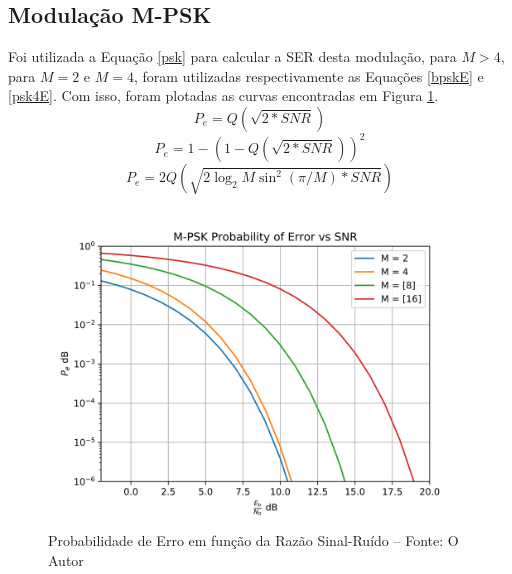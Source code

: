 \documentclass[10pt,two column,a4paper]{article}
\begin{document}
	\subsection{Modulação M-PSK}
	Foi utilizada a Equação \eqref{psk} para calcular a SER desta modulação, para $M>4$, para $M=2$ e $M=4$, foram utilizadas respectivamente as Equações \eqref{bpskE} e \eqref{psk4E}. Com isso, foram plotadas as curvas encontradas em Figura \ref{pskI}.
	\begin{equation}
	P_e = Q(\sqrt{2*SNR})\label{bpskE}
	\end{equation}
	\begin{equation}
	P_e = 1-(1-Q(\sqrt{2*SNR}))^2\label{psk4E}
	\end{equation}
	\begin{dmath}
		P_e  = 2 Q\left( \sqrt{2 \log_2M \sin^2(\pi/M)*SNR}\right) 
		\label{psk}
	\end{dmath}
	\begin{figure}[h]\centering
		\includegraphics[width=\linewidth]{imagens_ex1/psk.png}\caption{Probabilidade de Erro em função da Razão Sinal-Ruído -- Fonte: O Autor}\label{pskI}
	\end{figure}
\end{document}

